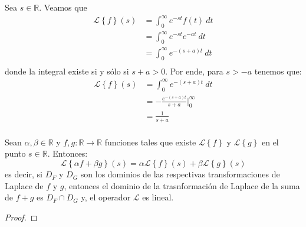 \documentclass[12pt]{report}
\theoremstyle{largebreak}
\newcommand\cf[3]{\ensuremath{#1:#2\rightarrow#3}}
\begin{document}
    \begin{sol}
        Sea $s\in\mathbb{R}$. Veamos que
        \begin{equation*}
            \begin{split}
                \mathcal{L}\left\{f\right\}(s)&=\int_0^{\infty}e^{-st}f(t)\:dt\\
                &=\int_0^{\infty}e^{-st}e^{ -at}\:dt\\
                &=\int_0^{\infty}e^{-(s+a)t}\:dt\\
            \end{split}
        \end{equation*}
        donde la integral existe si y sólo si $s+a>0$. Por ende, para $s>-a$ tenemos que:
        \begin{equation*}
            \begin{split}
                \mathcal{L}\left\{f\right\}(s)&=\int_0^{\infty}e^{-(s+a)t}\:dt\\
                &=-\frac{e^{-(s+a)t}}{s+a}\Big|_0^{\infty}\\
                &=\frac{1}{s+a}\\
            \end{split}
        \end{equation*}
    \end{sol}

    \begin{theor}
        Sean $\alpha,\beta\in\mathbb{R}$ y $\cf{f,g}{\mathbb{R}}{\mathbb{R}}$ funciones tales que existe $\mathcal{L}\left\{f\right\}$ y $\mathcal{L}\left\{g\right\}$ en el punto $s\in\mathbb{R}$. Entonces:
        \begin{equation*}
            \mathcal{L}\left\{\alpha f+\beta g \right\}(s)=\alpha\mathcal{L}\left\{f\right\}(s)+\beta\mathcal{L}\left\{g\right\}(s)
        \end{equation*}
        es decir, si $D_F$ y $D_G$ son los dominios de las respectivas transformaciones de Laplace de $f$ y $g$, entonces el dominio de la trasnformación de Laplace de la suma de $f+g$ es $D_F\cap D_G$ y, el operador $\mathcal{L}$ es lineal.
    \end{theor}

    \begin{proof}
        
    \end{proof}

\end{document}
